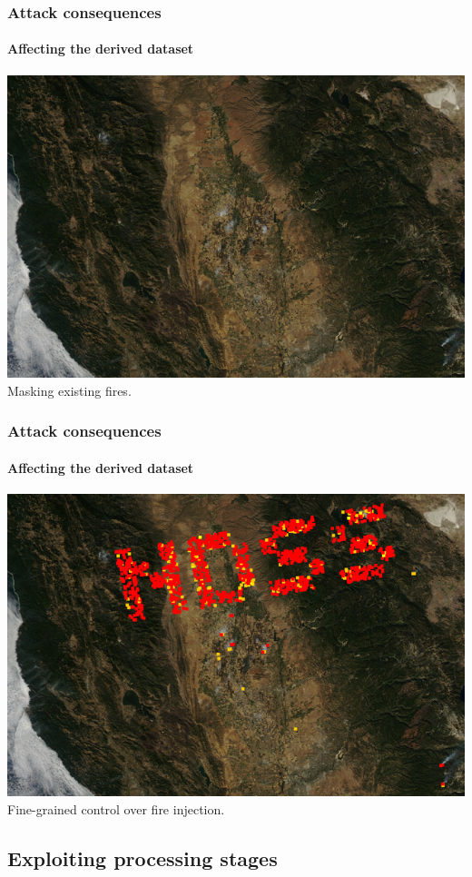 \documentclass{beamer}
\begin{document}
\begin{frame}
  \frametitle{Attack consequences}
  \framesubtitle{Affecting the derived dataset}
  \includegraphics[width=\textwidth]{images/injection/masked_0.jpg}
  \newline
  \centering
  Masking existing fires.
\end{frame}

\begin{frame}
  \frametitle{Attack consequences}
  \framesubtitle{Affecting the derived dataset}
  \includegraphics[width=\textwidth]{images/injection/pixels_800_140.jpg}
  \newline
  \centering
  Fine-grained control over fire injection.
\end{frame}

\subsection{Exploiting processing stages}
\end{document}
